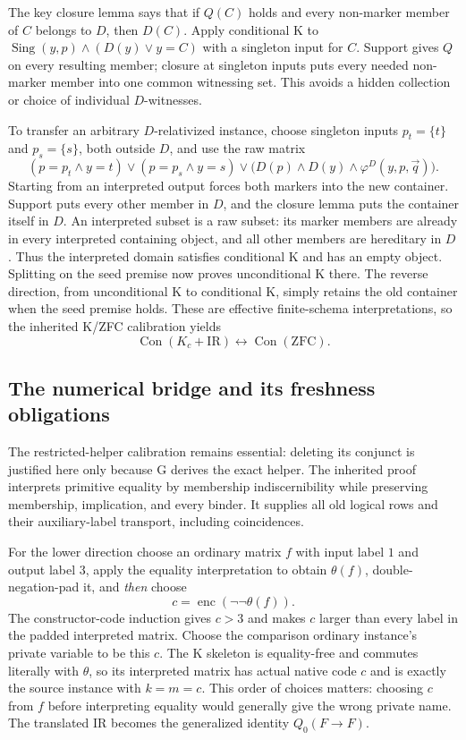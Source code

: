 The key closure lemma says that if $Q(C)$ holds and every non-marker
member of $C$ belongs to $D$, then $D(C)$. Apply conditional K to
$\operatorname{Sing}(y,p)\wedge(D(y)\vee y=C)$ with a singleton input
for $C$. Support gives $Q$ on every resulting member; closure at singleton
inputs puts every needed non-marker member into one common witnessing set.
This avoids a hidden collection or choice of individual $D$-witnesses.

To transfer an arbitrary $D$-relativized instance, choose singleton inputs
$p_t=\{t\}$ and $p_s=\{s\}$, both outside $D$, and use the raw matrix
\[
 (p=p_t\wedge y=t)\vee(p=p_s\wedge y=s)
 \vee\bigl(D(p)\wedge D(y)\wedge\varphi^D(y,p,\vec q)\bigr).
\]
Starting from an interpreted output forces both markers into the new
container. Support puts every other member in $D$, and the closure lemma
puts the container itself in $D$. An interpreted subset is a raw subset:
its marker members are already in every interpreted containing object,
and all other members are hereditary in $D$. Thus the interpreted domain
satisfies conditional K and has an empty object. Splitting on the seed
premise now proves unconditional K there. The reverse direction, from
unconditional K to conditional K, simply retains the old container when
the seed premise holds. These are effective finite-schema interpretations,
so the inherited K/ZFC calibration yields
\[
 \operatorname{Con}(K_c+\mathrm{IR})
 \longleftrightarrow\operatorname{Con}(\mathrm{ZFC}).
\]

\subsection{The numerical bridge and its freshness obligations}

The restricted-helper calibration remains essential: deleting its conjunct
is justified here only because G derives the exact helper. The inherited
proof interprets primitive equality by membership indiscernibility while
preserving membership, implication, and every binder. It supplies all old
logical rows and their auxiliary-label transport, including coincidences.

For the lower direction choose an ordinary matrix $f$ with input label $1$
and output label $3$, apply the equality interpretation to obtain
$\theta(f)$, double-negation-pad it, and \emph{then} choose
\[
 c=\operatorname{enc}(\neg\neg\theta(f)).
\]
The constructor-code induction gives $c>3$ and makes $c$ larger than
every label in the padded interpreted matrix. Choose the comparison
ordinary instance's private variable to be this $c$. The K skeleton is
equality-free and commutes literally with $\theta$, so its interpreted
matrix has actual native code $c$ and is exactly the source instance with
$k=m=c$. This order of choices matters: choosing $c$ from $f$ before
interpreting equality would generally give the wrong private name. The
translated IR becomes the generalized identity $Q_0(F\to F)$.

